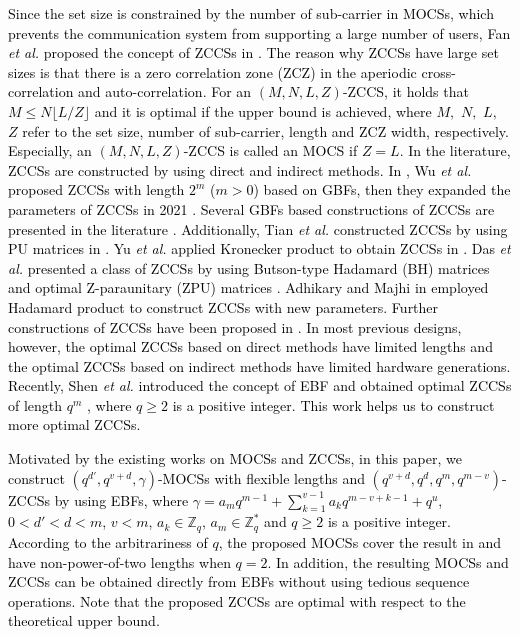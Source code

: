 \documentclass[11pt]{article}
\newcommand{\2} {$2$-to-$1$}
\begin{document}
 \textcolor{black}{Since the set size is constrained by the number of sub-carrier in MOCSs, which prevents the communication system from supporting a large number of users, Fan \emph{et al.} proposed the concept of ZCCSs in \cite{FP}. The reason why ZCCSs have large set sizes is that there is a zero correlation zone (ZCZ) in the aperiodic cross-correlation and auto-correlation. For an $( M, N,L, Z)$-ZCCS, it holds that $M\leq N\lfloor L/Z\rfloor$ and it is optimal if the upper bound is achieved, \textcolor{black}{where $M,$ $N,$ $L,$ $Z$ refer  to the set size, number of sub-carrier, length and ZCZ width, respectively.} Especially, an $( M, N,L, Z)$-ZCCS is called an MOCS if $Z = L$. 
In the literature, ZCCSs are constructed by using direct and indirect methods. In \cite{WS}, Wu \textit{et al.} proposed ZCCSs with length $2^m$ ($m>0$) based on GBFs, then they expanded the parameters of ZCCSs in 2021 \cite{SW2}.  Several  GBFs based constructions of ZCCSs are presented in the literature \cite{SP1,SP2,SP3,GG1}. Additionally, Tian \textit{et al.} constructed ZCCSs by using PU matrices in \cite{LT1}. Yu \textit{et al.} applied Kronecker product to obtain ZCCSs in \cite{TY1}. Das \textit{et al.} presented a class of ZCCSs by using Butson-type Hadamard (BH) matrices and optimal Z-paraunitary (ZPU) matrices \cite{DS}. Adhikary  and Majhi in \cite{AA} employed Hadamard product to construct ZCCSs with new parameters. Further constructions of ZCCSs  have been proposed in \cite{YL,GG,SP4,RA}. In most previous designs, however, the optimal ZCCSs based on  direct methods  have limited lengths and the optimal ZCCSs based on indirect methods have limited hardware generations. Recently, Shen \textit{et al.} introduced the concept of EBF  and obtained optimal ZCCSs of length $q^m$ \cite{SB}, where $q\geq 2$ is a positive integer. This work helps us to construct more optimal ZCCSs.}

\textcolor{black}{Motivated by the existing works on MOCSs and ZCCSs,  in this paper, we construct $(q^{d'},q^{v+d},\gamma )$-MOCSs with flexible lengths and   $ (q^{v+d},q^{d},q^{m},q^{m-v}) $-ZCCSs by using EBFs, where $\gamma=a_mq^{m-1}+\sum^{v-1}_{k=1}a_{k}q^{m-v+k-1}+q^{u}$, $0<d'<d<m $, $v<m$, $a_k\in\mathbb{Z}_{q}$, $a_m\in\mathbb{Z}^*_{q}$ and $q\geq 2$ is a  positive integer. According to the arbitrariness of $q$, the proposed MOCSs cover the result in \cite{PS2} and have non-power-of-two lengths when $q=2$. In addition, the resulting MOCSs and ZCCSs can be obtained directly from EBFs without using  tedious sequence operations. Note that the proposed ZCCSs are  optimal with respect to the theoretical upper bound.}
\end{document}
